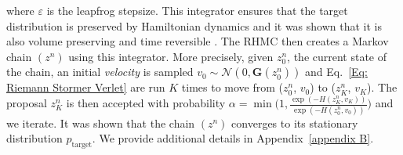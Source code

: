 \documentclass[10pt,journal,compsoc]{IEEEtran}
\begin{document}
    where $\varepsilon$ is the leapfrog stepsize. This integrator ensures that the target distribution is preserved by Hamiltonian dynamics and it was shown that it is also volume preserving and time reversible \cite{hairer_geometric_2006, leimkuhler_simulating_2004}. The RHMC then creates a Markov chain $(z^n)$ using this integrator. More precisely, given $z_0^n$, the current state of the chain, an initial \emph{velocity} is sampled $v_0 \sim \mathcal{N}(0, \mathbf{G}(z_0^n))$ and Eq.~\eqref{Eq: Riemann Stormer Verlet} are run $K$ times to move from ($z_0^n$, $v_0$) to ($z_K^n$, $v_K$). The proposal $z_K^n$ is then accepted with probability $\alpha = \min\Big(1, \frac{\exp (-H(z_K^n, v_K))}{\exp (-H(z_0^n, v_0))}\Big)$ and we iterate. It was shown that the chain $(z^n)$ converges to its stationary distribution $p_{\mathrm{target}}$\cite{duane_hybrid_1987, liu_monte_2008, neal_mcmc_2011}. We provide additional details in Appendix~\ref{appendix B}.
    
    
\end{document}
